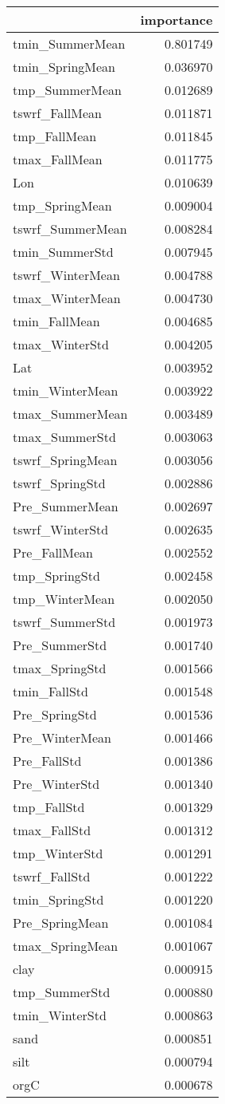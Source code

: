 \begin{tabular}{lr}
\toprule
 & importance \\
\midrule
tmin_SummerMean & 0.801749 \\
tmin_SpringMean & 0.036970 \\
tmp_SummerMean & 0.012689 \\
tswrf_FallMean & 0.011871 \\
tmp_FallMean & 0.011845 \\
tmax_FallMean & 0.011775 \\
Lon & 0.010639 \\
tmp_SpringMean & 0.009004 \\
tswrf_SummerMean & 0.008284 \\
tmin_SummerStd & 0.007945 \\
tswrf_WinterMean & 0.004788 \\
tmax_WinterMean & 0.004730 \\
tmin_FallMean & 0.004685 \\
tmax_WinterStd & 0.004205 \\
Lat & 0.003952 \\
tmin_WinterMean & 0.003922 \\
tmax_SummerMean & 0.003489 \\
tmax_SummerStd & 0.003063 \\
tswrf_SpringMean & 0.003056 \\
tswrf_SpringStd & 0.002886 \\
Pre_SummerMean & 0.002697 \\
tswrf_WinterStd & 0.002635 \\
Pre_FallMean & 0.002552 \\
tmp_SpringStd & 0.002458 \\
tmp_WinterMean & 0.002050 \\
tswrf_SummerStd & 0.001973 \\
Pre_SummerStd & 0.001740 \\
tmax_SpringStd & 0.001566 \\
tmin_FallStd & 0.001548 \\
Pre_SpringStd & 0.001536 \\
Pre_WinterMean & 0.001466 \\
Pre_FallStd & 0.001386 \\
Pre_WinterStd & 0.001340 \\
tmp_FallStd & 0.001329 \\
tmax_FallStd & 0.001312 \\
tmp_WinterStd & 0.001291 \\
tswrf_FallStd & 0.001222 \\
tmin_SpringStd & 0.001220 \\
Pre_SpringMean & 0.001084 \\
tmax_SpringMean & 0.001067 \\
clay & 0.000915 \\
tmp_SummerStd & 0.000880 \\
tmin_WinterStd & 0.000863 \\
sand & 0.000851 \\
silt & 0.000794 \\
orgC & 0.000678 \\
\bottomrule
\end{tabular}
